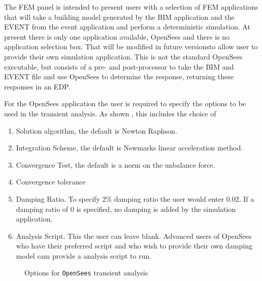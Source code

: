 The FEM panel is intended to present users with a selection of FEM
applications that will take a building model generated by the BIM
application and the EVENT from the event application and perform a
deterministic simulation.  At present there is only one application
available, OpenSees and there is no application selection box.  That
will be modified in future versionsto allow user to provide their own
simulation application.  This is not the standard OpenSees executable,
but consists of a pre- and post-processor to take the BIM and EVENT
file and use OpenSees to determine the response, returning these
responses in an EDP.

For the OpenSees application the user is required to specify the
options to be used in the transient analysis. As shown ,
this includes the choice of
\begin{enumerate}
\item Solution algorithm, the default is Newton Raphson.
\item Integration Scheme, the default is Newmarks linear acceleration
  method.
\item Convergence Test, the default is a norm on the unbalance force.
\item Convergence tolerance
\item Damping Ratio. To specify 2\% damping ratio the user would enter 0.02. If
a damping ratio of 0 is specified, no damping is added by the simulation application.
\item Analysis Script. This the user can leave blank. Advanced users of OpenSees who have their preferred script
and who wish to provide their own damping model cam provide a analysis script to run.
\end{enumerate}

\begin{figure}[!htbp]
  \caption{Options for \texttt{OpenSees} transient analysis}
  \label{fig:fem}
\end{figure}


